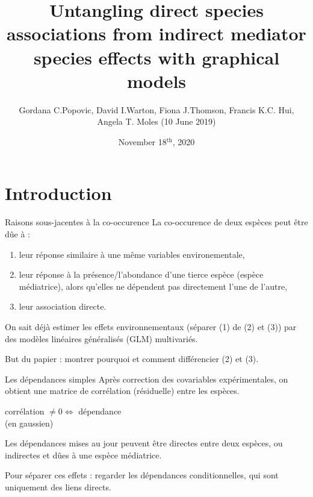 \documentclass[11pt]{beamer}
\title{Untangling direct species associations from indirect mediator species effects with graphical models}
\author{Gordana C.Popovic, David I.Warton, Fiona J.Thomson, Francis K.C. Hui, Angela T. Moles (10 June 2019)}
\date{November 18$^{\text{th}}$, 2020}
\newcommand{\emphase}[1]{\textcolor{Complement}{#1}}
\begin{document}
\begin{frame}
    \titlepage
\end{frame}
\section{Introduction}
\begin{frame}{Raisons sous-jacentes à la co-occurence}
La co-occurence de deux espèces peut être dûe à :\\

\begin{enumerate}
\item leur réponse similaire à une même variables environementale,
\item  leur réponse à la présence/l'abondance d'une tierce espèce (espèce médiatrice), alors qu'elles ne dépendent pas directement l'une de l'autre,
\item leur association directe.\\
\end{enumerate}

 \pause
 On sait déjà estimer les effets environnementaux (séparer (1) de (2) et (3)) par des modèles linéaires généralisés (GLM) multivariés.\\
 \bigskip
 
 But du papier : montrer pourquoi et comment différencier (2) et (3).
\end{frame}

 \begin{frame}{Les dépendances simples}
 Après correction des covariables expérimentales, on obtient une matrice de corrélation (résiduelle) entre les espèces.\\
 
 \begin{center}
 corrélation $\neq 0 \iff$ dépendance\\
 (en gaussien)\\
 \end{center}
 
 Les dépendances mises au jour peuvent être \emphase{directes} entre deux espèces, ou \emphase{indirectes} et dûes à une espèce médiatrice.

\bigskip

Pour séparer ces effets : regarder les dépendances conditionnelles, qui sont uniquement des liens directs.
 \end{frame}
\end{document}
